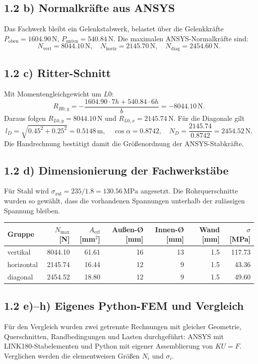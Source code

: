 \documentclass[10pt,a4paper]{article}
\begin{document}
\subsection*{1.2 b) Normalkräfte aus ANSYS}
Das Fachwerk bleibt ein Gelenkstabwerk, belastet über die Gelenkkräfte \(P_\mathrm{oben}=1604.90\,\mathrm{N}\), \(P_\mathrm{unten}=540.84\,\mathrm{N}\). Die maximalen ANSYS-Normalkräfte sind:
\[
N_\mathrm{vert}=8044.10\,\mathrm{N},\quad
N_\mathrm{horiz}=2145.70\,\mathrm{N},\quad
N_\mathrm{diag}=2454.60\,\mathrm{N}.
\]

\subsection*{1.2 c) Ritter-Schnitt}
Mit Momentengleichgewicht um \(L0\):
\[
R_{R0,y}=-\frac{1604.90\cdot7h+540.84\cdot6h}{b}=-8044.10\,\mathrm{N}.
\]
Daraus folgen \(R_{L0,y}=8044.10\,\mathrm{N}\) und \(R_{L0,x}=2145.74\,\mathrm{N}\). Für die Diagonale gilt
\[
l_D=\sqrt{0.45^2+0.25^2}=0.5148\,\mathrm{m},\quad
\cos\alpha=0.8742,\quad
N_D=\frac{2145.74}{0.8742}=2454.52\,\mathrm{N}.
\]
Die Handrechnung bestätigt damit die Größenordnung der ANSYS-Stabkräfte.

\subsection*{1.2 d) Dimensionierung der Fachwerkstäbe}
Für Stahl wird \(\sigma_\mathrm{zul}=235/1.8=130.56\,\mathrm{MPa}\) angesetzt. Die Rohrquerschnitte wurden so gewählt, dass die vorhandenen Spannungen unterhalb der zulässigen Spannung bleiben.

\begin{table}[H]\centering\small
\begin{tabular}{lrrrrrr}
\toprule
Gruppe & \(N_{\max}\) [N] & \(A_\mathrm{erf}\) [mm\(^2\)] & Außen-Ø [mm] & Innen-Ø [mm] & Wand [mm] & \(\sigma\) [MPa]\\
\midrule
vertikal & 8044.10 & 61.61 & 16 & 13 & 1.5 & 117.73\\
horizontal & 2145.74 & 16.44 & 12 & 9 & 1.5 & 43.36\\
diagonal & 2454.52 & 18.80 & 12 & 9 & 1.5 & 49.60\\
\bottomrule
\end{tabular}
\end{table}

\subsection*{1.2 e)--h) Eigenes Python-FEM und Vergleich}
Für den Vergleich wurden zwei getrennte Rechnungen mit gleicher Geometrie, Querschnitten, Randbedingungen und Lasten durchgeführt: ANSYS mit LINK180-Stabelementen und Python mit eigener Assemblierung von \(KU=F\). Verglichen werden die elementweisen Größen \(N_i\) und \(\sigma_i\).
\end{document}
